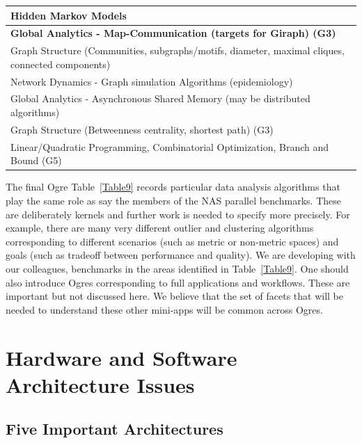 \documentclass{acm_proc_article-sp}
\begin{document}
\begin{table}
\begin{tabular}{|p{12cm}|}
Hidden Markov Models\\ \hline
\textbf{Global Analytics - Map-Communication (targets for Giraph) (G3)}\\ \hline
Graph Structure (Communities, subgraphs/motifs, diameter, maximal cliques, connected components)\\ \hline
Network Dynamics - Graph simulation Algorithms (epidemiology)\\ \hline
Global Analytics - Asynchronous Shared Memory (may be distributed algorithms)\\ \hline
Graph Structure (Betweenness centrality, shortest path) (G3)\\ \hline
Linear/Quadratic Programming, Combinatorial Optimization, Branch and Bound (G5)
\\ \hline
\end{tabular}
\end{table}


The final Ogre Table~\ref{Table9} records particular data analysis algorithms that play the same role as say the members of the NAS parallel benchmarks. These are deliberately kernels and further work is needed to specify more precisely. For example, there are many very different outlier and clustering algorithms corresponding to different scenarios (such as metric or non-metric spaces) and goals (such as tradeoff between performance and quality). We are developing with our colleagues, benchmarks in the areas identified in Table~\ref{Table9}. One should also introduce Ogres corresponding to full applications and workflows. These are important but not discussed here. We believe that the set of facets that will be needed to understand these other mini-apps will be common across Ogres.

\section{Hardware and Software Architecture Issues}
\subsection{Five Important Architectures}
\end{document}
